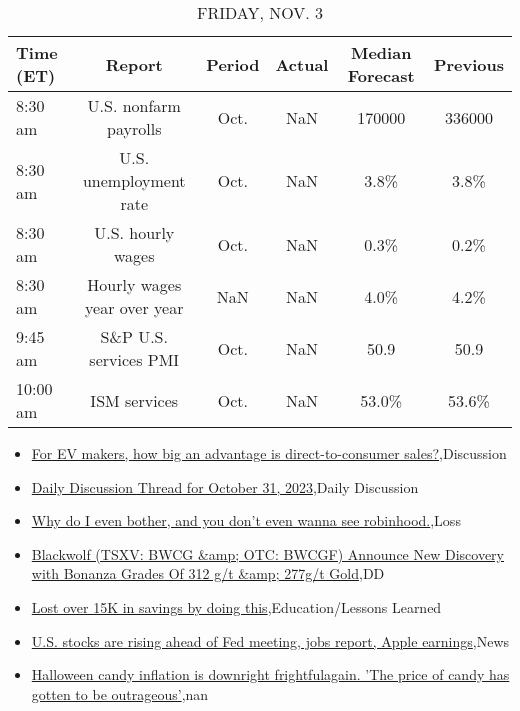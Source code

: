 \documentclass{article}%
\begin{document}
%


\begin{table}[htbp]%
\caption{FRIDAY, NOV. 3}%
\centering%
\begin{adjustbox}{width=1\textwidth}%
\begin{tabular}{lccccc}
\toprule
Time (ET) &                      Report & Period & Actual & Median Forecast & Previous \\
\midrule
  8:30 am &       U.S. nonfarm payrolls &   Oct. &    NaN &          170000 &   336000 \\
  8:30 am &      U.S. unemployment rate &   Oct. &    NaN &            3.8\% &     3.8\% \\
  8:30 am &           U.S. hourly wages &   Oct. &    NaN &            0.3\% &     0.2\% \\
  8:30 am & Hourly wages year over year &    NaN &    NaN &            4.0\% &     4.2\% \\
  9:45 am &       S\&P U.S. services PMI &   Oct. &    NaN &            50.9 &     50.9 \\
 10:00 am &                ISM services &   Oct. &    NaN &           53.0\% &    53.6\% \\
\bottomrule
\end{tabular}
%
\end{adjustbox}%
\end{table}

%
\begin{itemize}%
\item%
\href{https://reddit.com/r/wallstreetbets/comments/17khrvb/for\_ev\_makers\_how\_big\_an\_advantage\_is/}{For EV makers, how big an advantage is direct-to-consumer sales?},Discussion%
\item%
\href{https://reddit.com/r/wallstreetbets/comments/17khgft/daily\_discussion\_thread\_for\_october\_31\_2023/}{Daily Discussion Thread for October 31, 2023},Daily Discussion%
\item%
\href{https://reddit.com/r/wallstreetbets/comments/17kgrh7/why\_do\_i\_even\_bother\_and\_you\_dont\_even\_wanna\_see/}{Why do I even bother, and you don't even wanna see robinhood.},Loss%
\item%
\href{https://reddit.com/r/Baystreetbets/comments/17k2gnz/blackwolf\_tsxv\_bwcg\_otc\_bwcgf\_announce\_new/}{Blackwolf (TSXV: BWCG \&amp; OTC: BWCGF) Announce New Discovery with Bonanza Grades Of 312 g/t \&amp; 277g/t Gold},DD%
\item%
\href{https://reddit.com/r/StockMarket/comments/17jwuum/lost\_over\_15k\_in\_savings\_by\_doing\_this/}{Lost over 15K in savings by doing this},Education/Lessons Learned%
\item%
\href{https://reddit.com/r/StockMarket/comments/17junt0/us\_stocks\_are\_rising\_ahead\_of\_fed\_meeting\_jobs/}{U.S. stocks are rising ahead of Fed meeting, jobs report, Apple earnings},News%
\item%
\href{https://reddit.com/r/Economics/comments/17k6m7s/halloween\_candy\_inflation\_is\_downright/}{Halloween candy inflation is downright frightfulagain. 'The price of candy has gotten to be outrageous'},nan%
\end{itemize}%
\end{document}

